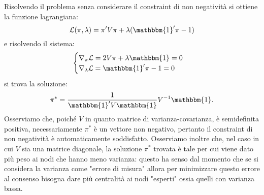 \begin{alphaparts}
    Risolvendo il problema senza considerare il constraint di non negatività si ottiene la funzione lagrangiana:
    \[\mathcal{L}(\pi, \lambda) = \pi'V\pi + \lambda(\mathbbm{1}'\pi- 1)\]
    e risolvendo il sistema:
    \begin{equation*}
        \begin{cases} \nabla_{\pi} \mathcal{L} = 2V\pi + \lambda \mathbbm{1} = 0 \\
        \nabla_{\lambda} \mathcal{L} = \mathbbm{1}'\pi- 1 = 0\end{cases} 
    \end{equation*}
    si trova la soluzione:
    \begin{equation}\label{optimal_pi}
        \pi^* = \frac{1}{\mathbbm{1}'V\mathbbm{1}} V^{- 1} \mathbbm{1}.
    \end{equation}
    Osserviamo che, poiché \(V\) in quanto matrice di varianza-covarianza, è semidefinita positiva, necessariamente \(\pi^*\) è un vettore non negativo, pertanto il constraint di non negatività è automaticamente soddisfatto.
    Osserviamo inoltre che, nel caso in cui \(V\) sia una matrice diagonale, la soluzione \(\pi^*\) trovata è tale per cui viene dato più peso ai nodi che hanno meno varianza: questo ha senso dal momento che se si considera la varianza come "errore di misura" allora per minimizzare questo errore al consenso bisogna dare più centralità ai nodi "esperti" ossia quelli con varianza bassa.

    \questionpart %


\end{alphaparts}
